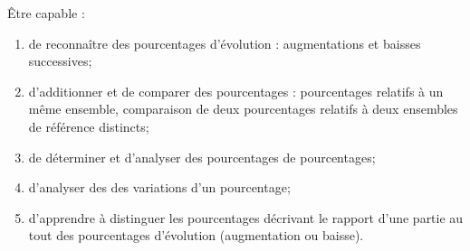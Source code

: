 \begin{myobj}
	Être capable : 
\begin{enumerate}
	\item de reconnaître des pourcentages d'évolution : augmentations et baisses successives;
	\item d'additionner et de comparer des pourcentages : pourcentages relatifs à un même ensemble, comparaison de deux pourcentages relatifs à deux ensembles de référence distincts;
	\item de déterminer et d'analyser des pourcentages de pourcentages;
	\item d'analyser des des variations d'un pourcentage;
	\item d'apprendre à distinguer les pourcentages décrivant le rapport d'une partie au tout des pourcentages d'évolution (augmentation ou baisse).
\end{enumerate}
\end{myobj}